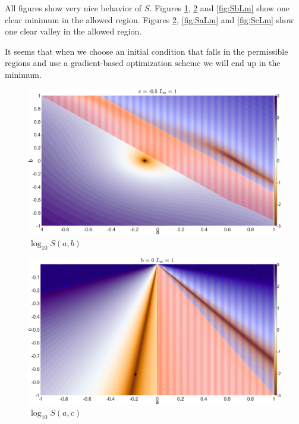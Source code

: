 \documentclass[smallextended]{svjour3}       %
\begin{document}
All figures show very nice behavior of $S$. Figures \ref{fig:Sab}, \ref{fig:Sac} and \ref{fig:SbLm} show one clear minimum in the allowed region. Figures \ref{fig:Sac}, \ref{fig:SaLm} and \ref{fig:ScLm} show one clear valley in the allowed region. 

It seems that when we choose an initial condition that falls in the permissible regions and use a gradient-based optimization scheme we will end up in the minimum. %

\begin{figure}[htbp]
		\centering \includegraphics[width = \textwidth]{leastsquaresab.png}
		\caption{$\log_{10}S(a,b)$}\label{fig:Sab}
\end{figure}
\begin{figure}[htbp]
		\centering \includegraphics[width = \textwidth]{leastsquaresac.png}
		\caption{$\log_{10}S(a,c)$}\label{fig:Sac}
\end{figure}
\end{document}
